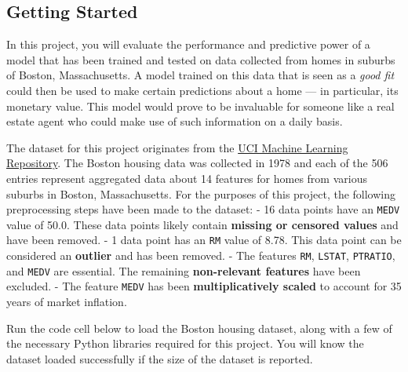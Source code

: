 \documentclass[11pt]{article}
\begin{document}
    \subsection{Getting Started}\label{getting-started}

In this project, you will evaluate the performance and predictive power
of a model that has been trained and tested on data collected from homes
in suburbs of Boston, Massachusetts. A model trained on this data that
is seen as a \emph{good fit} could then be used to make certain
predictions about a home --- in particular, its monetary value. This
model would prove to be invaluable for someone like a real estate agent
who could make use of such information on a daily basis.

The dataset for this project originates from the
\href{https://archive.ics.uci.edu/ml/datasets/Housing}{UCI Machine
Learning Repository}. The Boston housing data was collected in 1978 and
each of the 506 entries represent aggregated data about 14 features for
homes from various suburbs in Boston, Massachusetts. For the purposes of
this project, the following preprocessing steps have been made to the
dataset: - 16 data points have an
\texttt{\textquotesingle{}MEDV\textquotesingle{}} value of 50.0. These
data points likely contain \textbf{missing or censored values} and have
been removed. - 1 data point has an
\texttt{\textquotesingle{}RM\textquotesingle{}} value of 8.78. This data
point can be considered an \textbf{outlier} and has been removed. - The
features \texttt{\textquotesingle{}RM\textquotesingle{}},
\texttt{\textquotesingle{}LSTAT\textquotesingle{}},
\texttt{\textquotesingle{}PTRATIO\textquotesingle{}}, and
\texttt{\textquotesingle{}MEDV\textquotesingle{}} are essential. The
remaining \textbf{non-relevant features} have been excluded. - The
feature \texttt{\textquotesingle{}MEDV\textquotesingle{}} has been
\textbf{multiplicatively scaled} to account for 35 years of market
inflation.

Run the code cell below to load the Boston housing dataset, along with a
few of the necessary Python libraries required for this project. You
will know the dataset loaded successfully if the size of the dataset is
reported.
\end{document}
